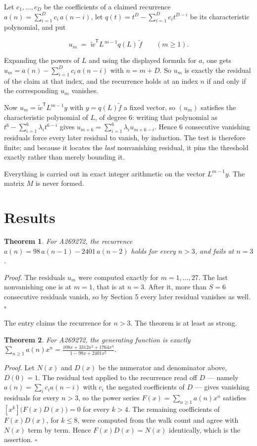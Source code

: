 \documentclass[11pt]{article}
\newtheorem{theorem}{Theorem}
\theoremstyle{definition}
\begin{document}
Let $c_1,\dots,c_D$ be the coefficients of a claimed recurrence $a(n) = \sum_{i=1}^{D} c_i\,a(n-i)$, let $q(t) = t^{D} - \sum_{i=1}^{D} c_i t^{D-i}$ be its characteristic polynomial, and put

\[u_m \;=\; \tilde w^{\mathsf T} L^{\,m-1} q(L)\,\tilde f \qquad (m \ge 1).\]

Expanding the powers of $L$ and using the displayed formula for $a$, one gets $u_m = a(n) - \sum_{i=1}^{D} c_i\,a(n-i)$ with $n = m + D$. So $u_m$ is exactly the residual of the claim at that index, and the recurrence holds at an index $n$ if and only if the corresponding $u_m$ vanishes.

Now $u_m = \tilde w^{\mathsf T} L^{m-1} y$ with $y = q(L)\tilde f$ a fixed vector, so $(u_m)$ satisfies the characteristic polynomial of $L$, of degree $6$: writing that polynomial as $t^{6} - \sum_{i=1}^{6} \lambda_i t^{6-i}$ gives $u_{m+6} = \sum_{i=1}^{6} \lambda_i u_{m+6-i}$. Hence $6$ consecutive vanishing residuals force every later residual to vanish, by induction. The test is therefore finite; and because it locates the {\itshape last} nonvanishing residual, it pins the threshold exactly rather than merely bounding it.

Everything is carried out in exact integer arithmetic on the vector $L^{m-1}y$. The matrix $M$ is never formed.

\section{Results}

\begin{theorem} For A269272, the recurrence $a(n) = 98\,a(n-1) - 2401\,a(n-2)$ holds for every $n > 3$, and fails at $n = 3$.\end{theorem}

{\itshape Proof.} The residuals $u_m$ were computed exactly for $m = 1,\dots,27$. The last nonvanishing one is at $m = 1$, that is at $n = 3$. After it, more than $S = 6$ consecutive residuals vanish, so by Section 5 every later residual vanishes as well. $\square$

The entry claims the recurrence for $n > 3$. The theorem is at least as strong.

\begin{theorem} For A269272, the generating function is exactly $\sum_{n\ge 1} a(n)x^n = \frac{108x + 3312x^{2} + 1764x^{3}}{1 - 98x + 2401x^{2}}$.\end{theorem}

{\itshape Proof.} Let $N(x)$ and $D(x)$ be the numerator and denominator above, $D(0)=1$. The residual test applied to the recurrence read off $D$ --- namely $a(n) = \sum_i c_i a(n-i)$ with $c_i$ the negated coefficients of $D$ --- gives vanishing residuals for every $n > 3$, so the power series $F(x)=\sum_{n\ge 1}a(n)x^n$ satisfies $[x^k]\bigl(F(x)D(x)\bigr) = 0$ for every $k > 4$. The remaining coefficients of $F(x)D(x)$, for $k \le 8$, were computed from the walk count and agree with $N(x)$ term by term. Hence $F(x)D(x) = N(x)$ identically, which is the assertion. $\square$
\end{document}
